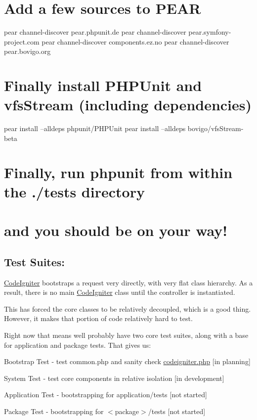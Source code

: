 \section*{Add a few sources to P\+E\+A\+R}

pear channel-\/discover pear.\+phpunit.\+de pear channel-\/discover pear.\+symfony-\/project.\+com pear channel-\/discover components.\+ez.\+no pear channel-\/discover pear.\+bovigo.\+org

\section*{Finally install P\+H\+P\+Unit and vfs\+Stream (including dependencies)}

pear install --alldeps phpunit/\+P\+H\+P\+Unit pear install --alldeps bovigo/vfs\+Stream-\/beta

\section*{Finally, run \textquotesingle{}phpunit\textquotesingle{} from within the ./tests directory}

\section*{and you should be on your way!}

\subsection*{Test Suites\+:}

\hyperlink{namespace_code_igniter}{Code\+Igniter} bootstraps a request very directly, with very flat class hierarchy. As a result, there is no main \hyperlink{namespace_code_igniter}{Code\+Igniter} class until the controller is instantiated.

This has forced the core classes to be relatively decoupled, which is a good thing. However, it makes that portion of code relatively hard to test.

Right now that means we\textquotesingle{}ll probably have two core test suites, along with a base for application and package tests. That gives us\+:


\begin{DoxyEnumerate}
\item Bootstrap Test -\/ test common.\+php and sanity check \hyperlink{_code_igniter_8php}{codeigniter.\+php} \mbox{[}in planning\mbox{]}
\item System Test -\/ test core components in relative isolation \mbox{[}in development\mbox{]}
\item Application Test -\/ bootstrapping for application/tests \mbox{[}not started\mbox{]}
\item Package Test -\/ bootstrapping for $<$package$>$/tests \mbox{[}not started\mbox{]}
\end{DoxyEnumerate}

